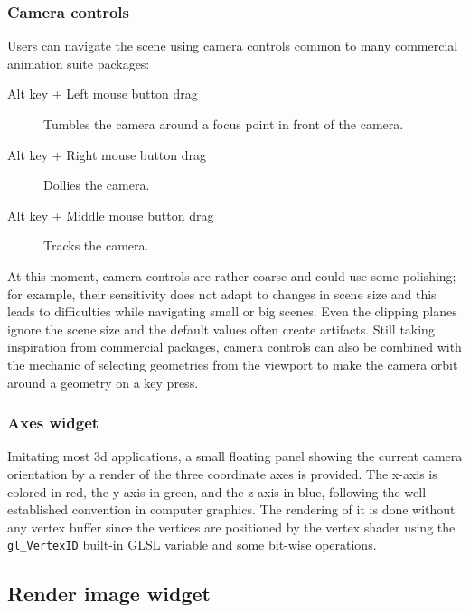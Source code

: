 
\subsubsection{Camera controls}
Users can navigate the scene using camera controls common to many commercial animation suite packages:
\begin{description}
	\item[Alt key + Left mouse button drag] Tumbles the camera around a focus point in front of the camera.
	\item[Alt key + Right mouse button drag] Dollies the camera.
	\item[Alt key + Middle mouse button drag] Tracks the camera. 
\end{description}
At this moment, camera controls are rather coarse and could use some polishing; for example, their sensitivity does not adapt to changes in scene size and this leads to difficulties while navigating small or big scenes. Even the clipping planes ignore the scene size and the default values often create artifacts. Still taking inspiration from commercial packages, camera controls can also be combined with the mechanic of selecting geometries from the viewport to make the camera orbit around a geometry on a key press.

\subsubsection{Axes widget}

Imitating most 3d applications, a small floating panel showing the current camera orientation by a render of the three coordinate axes is provided. The x-axis is colored in red, the y-axis in green, and the z-axis in blue, following the well established convention in computer graphics. The rendering of it is done without any vertex buffer since the vertices are positioned by the vertex shader using the \texttt{gl\_VertexID} built-in GLSL variable and some bit-wise operations. 

\subsection{Render image widget}
\label{image_widget}

